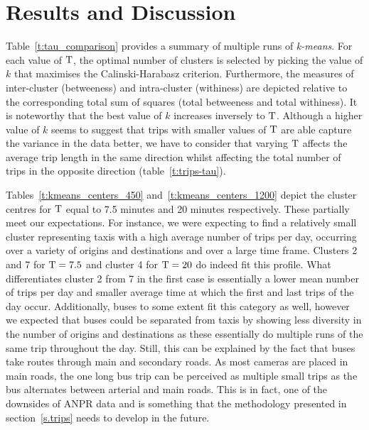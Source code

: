 \section{Results and Discussion}\label{s.results}

Table~\ref{t:tau_comparison} provides a summary of multiple runs of \emph{k-means}. For each value of $\mathrm{T}$, the optimal number of clusters is selected by picking the value of $k$ that maximises the Calinski-Harabasz criterion. Furthermore, the measures of inter-cluster (betweeness) and intra-cluster (withiness) are depicted relative to the corresponding total sum of squares (total betweeness and total withiness). It is noteworthy that the best value of $k$ increases inversely to $\mathrm{T}$. Although a higher value of $k$ seems to suggest that trips with smaller values of $\mathrm{T}$ are able capture the variance in the data better, we have to consider that varying $\mathrm{T}$ affects the average trip length in the same direction whilst affecting the total number of trips in the opposite direction (table~\ref{t:trips-tau}).

Tables~\ref{t:kmeans_centers_450} and~\ref{t:kmeans_centers_1200} depict the cluster centres for $\mathrm{T}$ equal to 7.5 minutes and 20 minutes respectively. These partially meet our expectations. For instance, we were expecting to find a relatively small cluster representing taxis with a high average number of trips per day, occurring over a variety of origins and destinations and over a large time frame. Clusters 2 and 7 for $\mathrm{T} = 7.5$ and cluster 4 for $\mathrm{T} = 20$ do indeed fit this profile. What differentiates cluster 2 from 7 in the first case is essentially a lower mean number of trips per day and smaller average time at which the first and last trips of the day occur. Additionally, buses to some extent fit this category as well, however we expected that buses could be separated from taxis by showing less diversity in the number of origins and destinations as these essentially do multiple runs of the same trip throughout the day. Still, this can be explained by the fact that buses take routes through main and secondary roads. As most cameras are placed in main roads, the one long bus trip can be perceived as multiple small trips as the bus alternates between arterial and main roads. This is in fact, one of the downsides of ANPR data and is something that the methodology presented in section~\ref{s.trips} needs to develop in the future.

